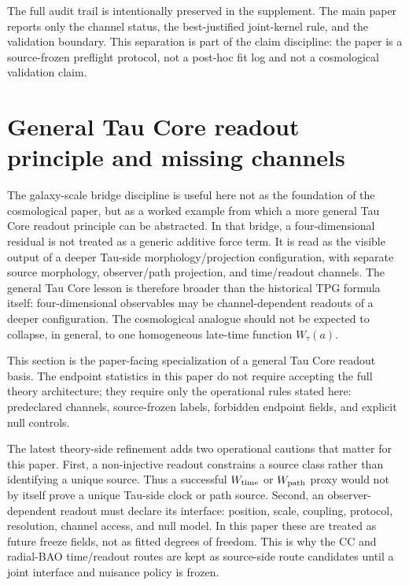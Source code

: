 \documentclass[11pt]{article}
\begin{document}
The full audit trail is intentionally preserved in the supplement.  The main
paper reports only the channel status, the best-justified joint-kernel rule, and
the validation boundary.  This separation is part of the claim discipline: the
paper is a source-frozen preflight protocol, not a post-hoc fit log and not a
cosmological validation claim.

\section{General Tau Core readout principle and missing channels}

The galaxy-scale bridge discipline is useful here not as the foundation of the
cosmological paper, but as a worked example from which a more general Tau Core
readout principle can be abstracted. In that bridge, a four-dimensional
residual is not treated as a generic additive force term. It is read as the
visible output of a deeper Tau-side morphology/projection configuration, with
separate source morphology, observer/path projection, and time/readout channels.
The general Tau Core lesson is therefore broader than the historical TPG
formula itself:
four-dimensional observables may be channel-dependent readouts of a deeper
configuration. The cosmological analogue should not be expected to collapse, in
general, to one homogeneous late-time function \(W_\tau(a)\).

This section is the paper-facing specialization of a general Tau Core readout
basis. The endpoint statistics in this paper do not require accepting the full
theory architecture; they require only the operational rules stated here:
predeclared channels, source-frozen labels, forbidden endpoint fields, and
explicit null controls.

The latest theory-side refinement adds two operational cautions that matter for
this paper.  First, a non-injective readout constrains a source class rather
than identifying a unique source.  Thus a successful \(W_{\rm time}\) or
\(W_{\rm path}\) proxy would not by itself prove a unique Tau-side clock or
path source.  Second, an observer-dependent readout must declare its interface:
position, scale, coupling, protocol, resolution, channel access, and null
model.  In this paper these are treated as future freeze fields, not as fitted
degrees of freedom.  This is why the CC and radial-BAO time/readout routes are
kept as source-side route candidates until a joint interface and nuisance
policy is frozen.
\end{document}
